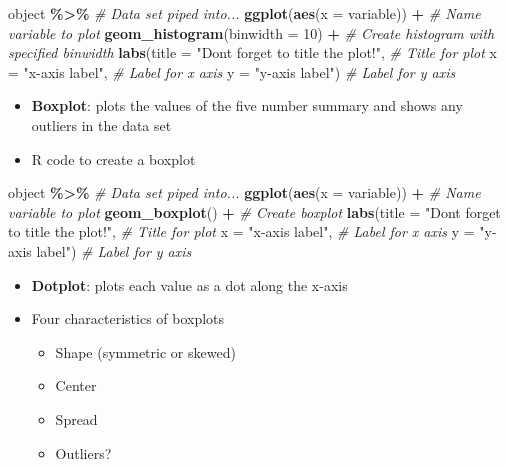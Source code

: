 \documentclass[
]{report}
\newenvironment{Shaded}{\begin{snugshade}}{\end{snugshade}}
\newcommand{\AttributeTok}[1]{\textcolor[rgb]{0.13,0.29,0.53}{#1}}
\newcommand{\CommentTok}[1]{\textcolor[rgb]{0.56,0.35,0.01}{\textit{#1}}}
\newcommand{\DecValTok}[1]{\textcolor[rgb]{0.00,0.00,0.81}{#1}}
\newcommand{\FunctionTok}[1]{\textcolor[rgb]{0.13,0.29,0.53}{\textbf{#1}}}
\newcommand{\NormalTok}[1]{#1}
\newcommand{\SpecialCharTok}[1]{\textcolor[rgb]{0.81,0.36,0.00}{\textbf{#1}}}
\newcommand{\StringTok}[1]{\textcolor[rgb]{0.31,0.60,0.02}{#1}}
\begin{document}
\begin{Shaded}
\begin{Highlighting}[]
\NormalTok{    object }\SpecialCharTok{\%\textgreater{}\%} \CommentTok{\# Data set piped into...}
        \FunctionTok{ggplot}\NormalTok{(}\FunctionTok{aes}\NormalTok{(}\AttributeTok{x =}\NormalTok{ variable)) }\SpecialCharTok{+}   \CommentTok{\# Name variable to plot}
        \FunctionTok{geom\_histogram}\NormalTok{(}\AttributeTok{binwidth =} \DecValTok{10}\NormalTok{) }\SpecialCharTok{+}  \CommentTok{\# Create histogram with specified binwidth}
        \FunctionTok{labs}\NormalTok{(}\AttributeTok{title =} \StringTok{"Don\textquotesingle{}t forget to title the plot!"}\NormalTok{, }\CommentTok{\# Title for plot}
            \AttributeTok{x =} \StringTok{"x{-}axis label"}\NormalTok{, }\CommentTok{\# Label for x axis}
            \AttributeTok{y =} \StringTok{"y{-}axis label"}\NormalTok{) }\CommentTok{\# Label for y axis}
\end{Highlighting}
\end{Shaded}

\begin{itemize}
\item
  \textbf{Boxplot}: plots the values of the five number summary and shows any outliers in the data set
\item
  R code to create a boxplot
\end{itemize}

\begin{Shaded}
\begin{Highlighting}[]
\NormalTok{    object }\SpecialCharTok{\%\textgreater{}\%} \CommentTok{\# Data set piped into...}
        \FunctionTok{ggplot}\NormalTok{(}\FunctionTok{aes}\NormalTok{(}\AttributeTok{x =}\NormalTok{ variable)) }\SpecialCharTok{+} \CommentTok{\# Name variable to plot}
        \FunctionTok{geom\_boxplot}\NormalTok{() }\SpecialCharTok{+} \CommentTok{\# Create boxplot }
        \FunctionTok{labs}\NormalTok{(}\AttributeTok{title =} \StringTok{"Don\textquotesingle{}t forget to title the plot!"}\NormalTok{, }\CommentTok{\# Title for plot}
            \AttributeTok{x =} \StringTok{"x{-}axis label"}\NormalTok{, }\CommentTok{\# Label for x axis}
            \AttributeTok{y =} \StringTok{"y{-}axis label"}\NormalTok{) }\CommentTok{\# Label for y axis}
\end{Highlighting}
\end{Shaded}

\begin{itemize}
\item
  \textbf{Dotplot}: plots each value as a dot along the x-axis
\item
  Four characteristics of boxplots

  \begin{itemize}
  \item
    Shape (symmetric or skewed)
  \item
    Center
  \item
    Spread
  \item
    Outliers?
  \end{itemize}
\end{itemize}
\end{document}
